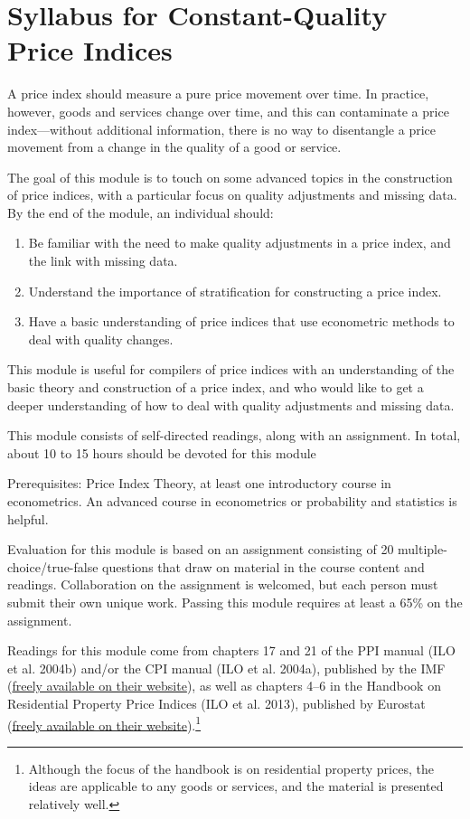 \documentclass[]{article}
\begin{document}
\hypertarget{syllabus-for-constant-quality-price-indices}{%
\section{Syllabus for Constant-Quality Price Indices}\label{syllabus-for-constant-quality-price-indices}}

A price index should measure a pure price movement over time. In practice, however, goods and services change over time, and this can contaminate a price index---without additional information, there is no way to disentangle a price movement from a change in the quality of a good or service.

The goal of this module is to touch on some advanced topics in the construction of price indices, with a particular focus on quality adjustments and missing data. By the end of the module, an individual should:

\begin{enumerate}
\def\labelenumi{\arabic{enumi}.}
\item
  Be familiar with the need to make quality adjustments in a price index, and the link with missing data.
\item
  Understand the importance of stratification for constructing a price index.
\item
  Have a basic understanding of price indices that use econometric methods to deal with quality changes.
\end{enumerate}

This module is useful for compilers of price indices with an understanding of the basic theory and construction of a price index, and who would like to get a deeper understanding of how to deal with quality adjustments and missing data.

This module consists of self-directed readings, along with an assignment. In total, about 10 to 15 hours should be devoted for this module

Prerequisites: Price Index Theory, at least one introductory course in econometrics. An advanced course in econometrics or probability and statistics is helpful.

Evaluation for this module is based on an assignment consisting of 20 multiple-choice/true-false questions that draw on material in the course content and readings. Collaboration on the assignment is welcomed, but each person must submit their own unique work. Passing this module requires at least a 65\% on the assignment.

Readings for this module come from chapters 17 and 21 of the PPI manual (ILO et al. 2004b) and/or the CPI manual (ILO et al. 2004a), published by the IMF (\href{https://www.imf.org/en/Publications/Manuals-Guides/Issues/2016/12/30/Producer-Price-Index-Manual-Theory-and-Practice-16966}{freely available on their website}), as well as chapters 4--6 in the Handbook on Residential Property Price Indices (ILO et al. 2013), published by Eurostat (\href{https://ec.europa.eu/eurostat/web/products-manuals-and-guidelines/-/KS-RA-12-022}{freely available on their website}).\footnote{Although the focus of the handbook is on residential property prices, the ideas are applicable to any goods or services, and the material is presented relatively well.}
\end{document}
